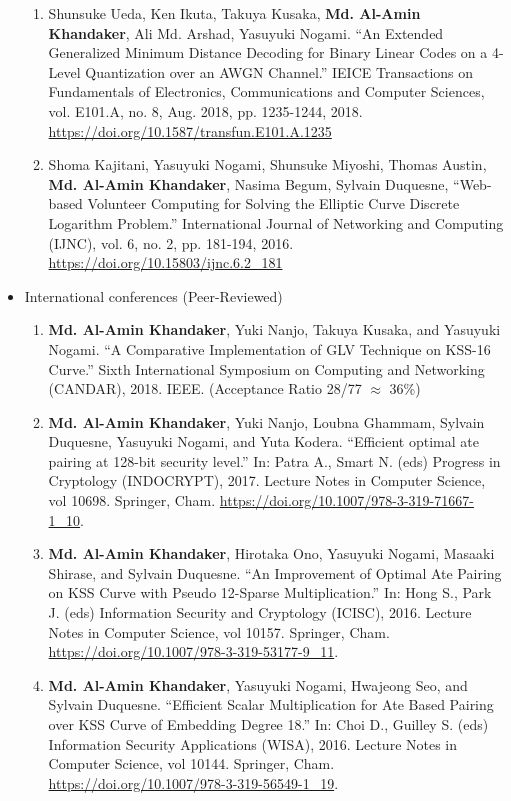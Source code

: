 \begin{itemize}
\begin{enumerate}
	\item	Shunsuke Ueda, Ken Ikuta, Takuya Kusaka,  \textbf{Md. Al-Amin Khandaker}, Ali Md. Arshad, Yasuyuki Nogami. ``An Extended Generalized Minimum Distance Decoding for Binary Linear Codes on a 4-Level Quantization over an AWGN Channel.'' IEICE Transactions on Fundamentals of Electronics, Communications and Computer Sciences, vol. E101.A, no. 8, Aug. 2018, pp. 1235-1244, 2018. \url{https://doi.org/10.1587/transfun.E101.A.1235}
	
	\item Shoma Kajitani, Yasuyuki Nogami, Shunsuke Miyoshi, Thomas Austin, \textbf{Md. Al-Amin Khandaker}, Nasima Begum, Sylvain Duquesne, ``Web-based Volunteer Computing for Solving the Elliptic Curve Discrete Logarithm Problem.'' International Journal of Networking and Computing (IJNC), vol. 6, no. 2, pp. 181-194, 2016.
	\url{https://doi.org/10.15803/ijnc.6.2_181}
	
\end{enumerate}
\newpage
\item International conferences (Peer-Reviewed)
\normalsize
\begin{enumerate}
	
		\item \textbf{Md. Al-Amin Khandaker}, Yuki Nanjo, Takuya Kusaka, and Yasuyuki Nogami. ``A Comparative Implementation of GLV Technique on KSS-16 Curve.'' Sixth International Symposium on Computing and Networking (CANDAR), 2018. IEEE. (Acceptance Ratio 28/77 $\approx$ 36\%)
	
	\item \textbf{Md. Al-Amin Khandaker}, Yuki Nanjo, Loubna Ghammam, Sylvain Duquesne, Yasuyuki Nogami, and Yuta Kodera. ``Efficient optimal ate pairing at 128-bit security level.'' In: Patra A., Smart N. (eds) Progress in Cryptology (INDOCRYPT), 2017. Lecture Notes in Computer Science, vol 10698. Springer, Cham.
	\url{https://doi.org/10.1007/978-3-319-71667-1_10}.
	
	\item \textbf{Md. Al-Amin Khandaker}, Hirotaka Ono, Yasuyuki Nogami, Masaaki Shirase, and Sylvain Duquesne. ``An Improvement of Optimal Ate Pairing on KSS Curve with Pseudo 12-Sparse Multiplication.'' In: Hong S., Park J. (eds) Information Security and Cryptology (ICISC), 2016. Lecture Notes in Computer Science, vol 10157. Springer, Cham. \url{https://doi.org/10.1007/978-3-319-53177-9_11}.
	
		\item \textbf{Md. Al-Amin Khandaker}, Yasuyuki Nogami, Hwajeong Seo, and Sylvain Duquesne. ``Efficient Scalar Multiplication for Ate Based Pairing over KSS Curve of Embedding Degree 18.'' In: Choi D., Guilley S. (eds) Information Security Applications (WISA), 2016. Lecture Notes in Computer Science, vol 10144. Springer, Cham. \url{https://doi.org/10.1007/978-3-319-56549-1_19}. 


\end{enumerate}
\end{itemize}
